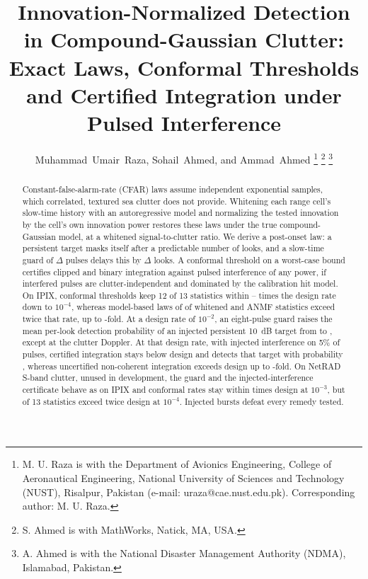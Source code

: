 \documentclass[journal]{IEEEtran}
\begin{document}
\title{Innovation-Normalized Detection in Compound-Gaussian Clutter: Exact Laws, Conformal Thresholds and Certified Integration under Pulsed Interference}

\author{Muhammad~Umair~Raza, Sohail~Ahmed, and Ammad~Ahmed%
\thanks{M. U. Raza is with the Department of Avionics Engineering, College of Aeronautical Engineering, National University of Sciences and Technology (NUST), Risalpur, Pakistan (e-mail: uraza@cae.nust.edu.pk). Corresponding author: M. U. Raza.}%
\thanks{S. Ahmed is with MathWorks, Natick, MA, USA.}%
\thanks{A. Ahmed is with the National Disaster Management Authority (NDMA), Islamabad, Pakistan.}}

\maketitle

\begin{abstract}
Constant-false-alarm-rate (CFAR) laws assume independent exponential samples, which correlated, textured sea clutter does not provide. Whitening each range cell's slow-time history with an autoregressive model and normalizing the tested innovation by the cell's own innovation power restores these laws under the true compound-Gaussian model, at a whitened signal-to-clutter ratio. We derive a post-onset law: a persistent target masks itself after a predictable number of looks, and a slow-time guard of $\Delta$ pulses delays this by $\Delta$ looks. A conformal threshold on a worst-case bound certifies clipped and binary integration against pulsed interference of any power, if interfered pulses are clutter-independent and dominated by the calibration hit model. On IPIX, conformal thresholds keep 12 of 13 statistics within \LConfMinFour--\LConfMaxFour{} times the design rate down to $10^{-4}$, whereas model-based laws of \NWhitenedLawsFail{} of \NWhitenedLaws{} whitened and ANMF statistics exceed twice that rate, up to \LAnalMaxFour-fold. At a design rate of $10^{-2}$, an eight-pulse guard raises the mean per-look detection probability of an injected persistent 10~dB target from \GuardMeanLookZero{} to \GuardMeanLookEight, except at the clutter Doppler. At that design rate, with injected interference on 5\% of pulses, certified integration stays below design and detects that target with probability \CertSixPdFive, whereas uncertified non-coherent integration exceeds design up to \IPfaMaxInt-fold. On NetRAD S-band clutter, unused in development, the guard and the injected-interference certificate behave as on IPIX and conformal rates stay within \NetConfMaxThree{} times design at $10^{-3}$, but \NetNOverTwoFour{} of 13 statistics exceed twice design at $10^{-4}$. Injected bursts defeat every remedy tested.
\end{abstract}
\end{document}
